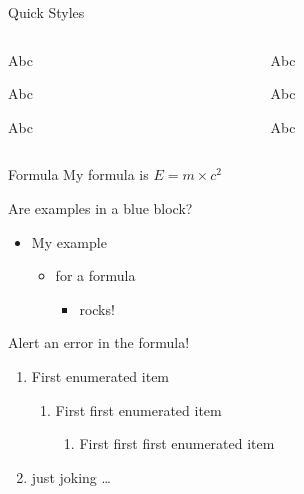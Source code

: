 \documentclass[aspectratio=1610]{beamer}
\begin{document}
\begin{frame}{Quick Styles}
\begin{columns}
    \begin{column}{0.12\paperwidth}
    \begin{yellow0block}{Abc}
    \end{yellow0block}
    \begin{yellow1block}{Abc}
    \end{yellow1block}
    \begin{yellow2block}{Abc}
    \end{yellow2block}
    \end{column}

    \begin{column}{0.12\paperwidth}
    \begin{red0block}{Abc}
    \end{red0block}
    \begin{red1block}{Abc}
    \end{red1block}
    \begin{red2block}{Abc}
    \end{red2block}
    \end{column}

\end{columns}
\end{frame}

\begin{frame}{Formula}
    My formula is $E=m\times c^2$
    \begin{blue2block}{Are examples in a blue block?}
    \begin{itemize}
        \item My example
        \begin{itemize}
            \item for a formula
            \begin{itemize}
                \item rocks!
            \end{itemize}
        \end{itemize}
    \end{itemize}
    \end{blue2block}

    \begin{red2block}{Alert an error in the formula!}
    \begin{enumerate}
        \item First enumerated item
        \begin{enumerate}
            \item First first enumerated item
            \begin{enumerate}
                \item First first first enumerated item
            \end{enumerate}
        \end{enumerate}
        \item just joking \dots
    \end{enumerate}
    \end{red2block}
\end{frame}
\end{document}
